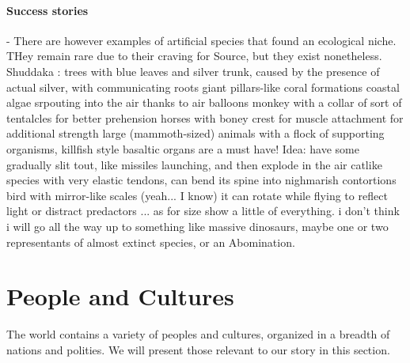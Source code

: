 \paragraph{Success stories}



- There are however examples of artificial species that found an ecological niche. THey remain rare due to their craving for Source, but they exist nonetheless. 
	Shuddaka : trees with blue leaves and silver trunk, caused by the presence of actual silver, with communicating roots
	giant pillars-like coral formations
	coastal algae srpouting into the air thanks to air balloons
	monkey with a collar of sort of tentalcles for better prehension
	horses with boney crest for muscle attachment for additional strength
	large (mammoth-sized) animals with a flock of supporting organisms, killfish style
	basaltic organs are a must have! Idea: have some gradually slit tout, like missiles launching, and then explode in the air
	catlike species with very elastic tendons, can bend its spine into nighmarish contortions
	bird with mirror-like scales (yeah... I know) it can rotate while flying to reflect light or distract predactors
... as for size show a little of everything. i don't think i will go all the way up to something like massive dinosaurs, maybe one or two representants of almost extinct species, or an Abomination.






































\section{People and Cultures}

The world contains a variety of peoples and cultures, organized in a breadth of nations and polities. We will present those relevant to our story in this section.


